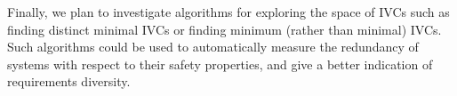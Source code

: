 Finally, we plan to investigate algorithms for exploring the space of IVCs such as finding distinct minimal IVCs or finding minimum (rather than minimal) IVCs. Such algorithms could be used to automatically measure the redundancy of systems with respect to their safety properties, and give a better indication of requirements diversity.


